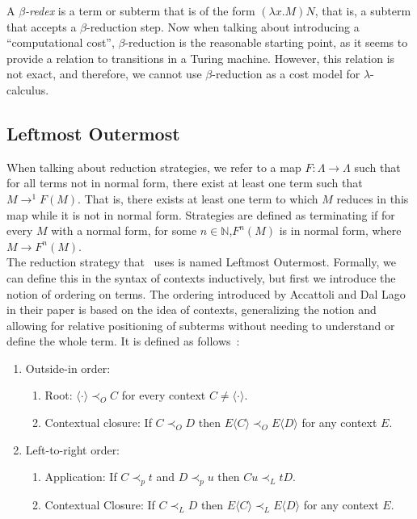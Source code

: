 \documentclass[11pt]{article}
\begin{document}
A \textit{$\beta$-redex} is a term or subterm that is of the form $(\lambda x . M)N$, that is, a subterm that accepts a $\beta$-reduction step.
Now when talking about introducing a \enquote{computational cost}, $\beta$-reduction is the reasonable starting point, as it seems to provide a relation to transitions in a Turing machine. However, this relation is not exact, and therefore, we cannot use $\beta$-reduction as a cost model for $\lambda$-calculus.

\subsection{Leftmost Outermost}
When talking about reduction strategies, we refer to a map $F : \Lambda \rightarrow \Lambda$ such that for all terms not in normal form, there exist at least one term such that $M \rightarrow^1 F(M)$. That is, there exists at least one term to which $M$ reduces in this map while it is not in normal form. Strategies are defined as terminating if for every $M$ with a normal form, for some $n \in \mathbb{N}$,$ F^{n} (M)$ is in normal form, where $M \rightarrow F^n(M)$. \\
The reduction strategy that~\cite{beta-invariance} uses is named Leftmost Outermost. 
Formally, we can define this in the syntax of contexts inductively, but first we introduce the notion of ordering on terms. The ordering introduced by Accattoli and Dal Lago in their paper is based on the idea of contexts, generalizing the notion and allowing for relative positioning of subterms without needing to understand or define the whole term. It is defined as follows~\cite{beta-invariance}:
\begin{enumerate}
  \item Outside-in order:
        \begin{enumerate}
          \item Root: $\langle \cdot \rangle \prec_{O} C$ for every context $C \neq \langle \cdot \rangle$.
          \item Contextual closure: If $C \prec_{O} D$ then $E\langle C \rangle \prec_{O} E\langle D \rangle $ for any context $E$.
        \end{enumerate}
  \item Left-to-right order:
        \begin{enumerate}
          \item Application: If $C \prec_{p} t$ and $D \prec_{p} u$ then $Cu \prec_{L} tD$.
          \item Contextual Closure: If $C \prec_{L} D$ then  $E\langle C \rangle \prec_{L} E\langle D\rangle$ for any context $E$.
        \end{enumerate}
\end{enumerate}
\end{document}
